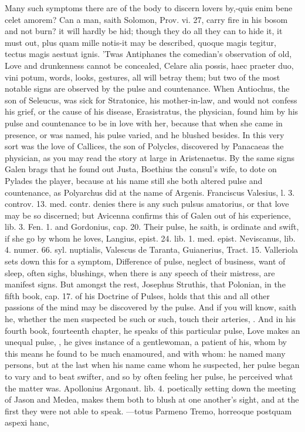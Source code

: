 {Many such symptoms there are of the body to discern lovers by,-quis
enim bene celet amorem? Can a man, saith Solomon, Prov. vi. 27, carry
fire in his bosom and not burn? it will hardly be hid; though they do
all they can to hide it, it must out, plus quam mille notis-it may be
described, quoque magis tegitur, tectus magis aestuat ignis.
'Twas Antiphanes the comedian's observation of old, Love and
drunkenness cannot be concealed, Celare alia possis, haec praeter duo,
vini potum, \etc{} words, looks, gestures, all will betray them; but two
of the most notable signs are observed by the pulse and countenance.
When Antiochus, the son of Seleucus, was sick for Stratonice, his
mother-in-law, and would not confess his grief, or the cause of his
disease, Erasistratus, the physician, found him by his pulse and
countenance to be in love with her, because that when she came in
presence, or was named, his pulse varied, and he blushed besides. In
this very sort was the love of Callices, the son of Polycles,
discovered by Panacaeas the physician, as you may read the story at
large in Aristenaetus. By the same signs Galen brags that he
found out Justa, Boethius the consul's wife, to dote on Pylades the
player, because at his name still she both altered pulse and
countenance, as  Polyarchus did at the name of Argenis.
Franciscus Valesius, l. 3. controv. 13. med. contr. denies there is any
such pulsus amatorius, or that love may be so discerned; but Avicenna
confirms this of Galen out of his experience, lib. 3. Fen. 1. and
Gordonius, cap. 20. Their pulse, he saith, is ordinate and swift,
if she go by whom he loves, Langius, epist. 24. lib. 1. med. epist.
Neviscanus, lib. 4. numer. 66. syl. nuptialis, Valescus de Taranta,
Guianerius, Tract. 15. Valleriola sets down this for a symptom,
Difference of pulse, neglect of business, want of sleep, often
sighs, blushings, when there is any speech of their mistress, are
manifest signs. But amongst the rest, Josephus Struthis, that Polonian,
in the fifth book, cap. 17. of his Doctrine of Pulses, holds that this
and all other passions of the mind may be discovered by the pulse.
And if you will know, saith he, whether the men suspected be such
or such, touch their arteries, \etc{}. And in his fourth book, fourteenth
chapter, he speaks of this particular pulse,  Love makes an
unequal pulse, \etc{}, he gives instance of a gentlewoman, a patient
of his, whom by this means he found to be much enamoured, and with
whom: he named many persons, but at the last when his name came whom he
suspected, her pulse began to vary and to beat swifter, and so by
often feeling her pulse, he perceived what the matter was. Apollonius
Argonaut. lib. 4. poetically setting down the meeting of Jason and
Medea, makes them both to blush at one another's sight, and at the
first they were not able to speak.
---totus Parmeno
Tremo, horreoque postquam aspexi hanc,

}
